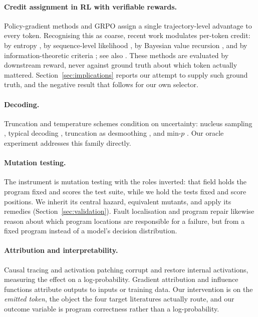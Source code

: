 \documentclass[twoside,11pt]{article}
\begin{document}
\paragraph{Credit assignment in RL with verifiable rewards.}
Policy-gradient methods \citep{williams1992reinforce, schulman2017ppo, ouyang2022training} and
GRPO \citep{shao2024deepseekmath} assign a single trajectory-level advantage to every token.
Recognising this as coarse, recent work modulates per-token credit: by entropy
\citep{wang2025entropy, gtpo2025}, by sequence-level likelihood \citep{tepo2026}, by Bayesian value
recursion \citep{oppo2026}, and by information-theoretic criteria \citep{iapo2026}; see also
\citet{grpoderivation2026}. These methods are evaluated by downstream reward, never against ground
truth about which token actually mattered. Section~\ref{sec:implications} reports our attempt to supply
such ground truth, and the negative result that follows for our own selector.

\paragraph{Decoding.}
Truncation and temperature schemes condition on uncertainty: nucleus sampling
\citep{holtzman2020curious}, typical decoding \citep{meister2023typical}, truncation as desmoothing
\citep{hewitt2022truncation}, and min-$p$ \citep{nguyen2024minp}. Our oracle experiment addresses
this family directly.

\paragraph{Mutation testing.}
The instrument is mutation testing \citep{jia2011mutation, papadakis2019mutation} with the roles
inverted: that field holds the program fixed and scores the test suite, while we hold the tests
fixed and score positions. We inherit its central hazard, equivalent mutants, and apply its remedies (Section~\ref{sec:validation}).
Fault localisation \citep{wong2016survey, sbest2024} and program repair
\citep{legoues2019apr, recoder2021, iter2023} likewise reason about which program locations are
responsible for a failure, but from a fixed program instead of a model's decision distribution.

\paragraph{Attribution and interpretability.}
Causal tracing \citep{meng2022rome} and activation patching \citep{zhang2024patching,
syed2024attribution, semanticconflicts2026} corrupt and restore internal activations, measuring the
effect on a log-probability. Gradient attribution \citep{sundararajan2017axiomatic} and influence
functions \citep{koh2017influence} attribute outputs to inputs or training data. Our intervention is
on the \emph{emitted token}, the object the four target literatures actually route, and our outcome
variable is program correctness rather than a log-probability.
\end{document}
